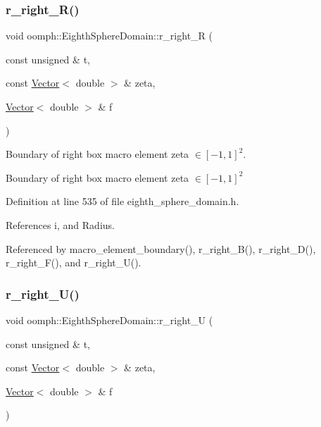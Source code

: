 \subsubsection{\texorpdfstring{r\+\_\+right\+\_\+\+R()}{r\_right\_R()}}
{\footnotesize\ttfamily void oomph\+::\+Eighth\+Sphere\+Domain\+::r\+\_\+right\+\_\+R (\begin{DoxyParamCaption}\item[{const unsigned \&}]{t,  }\item[{const \hyperlink{classoomph_1_1Vector}{Vector}$<$ double $>$ \&}]{zeta,  }\item[{\hyperlink{classoomph_1_1Vector}{Vector}$<$ double $>$ \&}]{f }\end{DoxyParamCaption})\hspace{0.3cm}{\ttfamily [private]}}



Boundary of right box macro element zeta $ \in [-1,1]^2 $. 

Boundary of right box macro element zeta $ \in [-1,1]^2 $ 

Definition at line 535 of file eighth\+\_\+sphere\+\_\+domain.\+h.



References i, and Radius.



Referenced by macro\+\_\+element\+\_\+boundary(), r\+\_\+right\+\_\+\+B(), r\+\_\+right\+\_\+\+D(), r\+\_\+right\+\_\+\+F(), and r\+\_\+right\+\_\+\+U().

\mbox{\label{classoomph_1_1EighthSphereDomain_a004a1adfe832e2b233f8ec1b6a58b9aa}} 
\subsubsection{\texorpdfstring{r\+\_\+right\+\_\+\+U()}{r\_right\_U()}}
{\footnotesize\ttfamily void oomph\+::\+Eighth\+Sphere\+Domain\+::r\+\_\+right\+\_\+U (\begin{DoxyParamCaption}\item[{const unsigned \&}]{t,  }\item[{const \hyperlink{classoomph_1_1Vector}{Vector}$<$ double $>$ \&}]{zeta,  }\item[{\hyperlink{classoomph_1_1Vector}{Vector}$<$ double $>$ \&}]{f }\end{DoxyParamCaption})\hspace{0.3cm}{\ttfamily [private]}}



